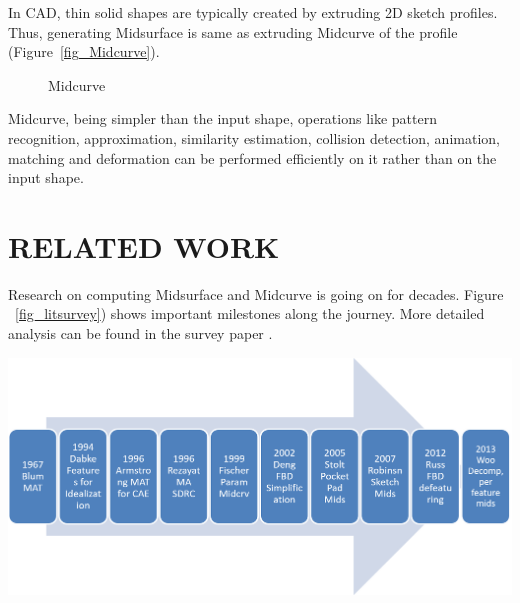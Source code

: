 \documentclass[9pt,academicons]{article}
\begin{document}
In CAD, thin solid shapes are typically created by extruding 2D sketch profiles. Thus, generating Midsurface is same as extruding Midcurve of the profile (Figure~\ref{fig_Midcurve}).

	\begin{figure} [!h]
		\centering
	 \quad
		\caption{Midcurve}
	\end{figure}
	
	
Midcurve, being simpler than the input shape, operations like pattern recognition, approximation, similarity estimation, collision detection, animation, matching and deformation can be performed efficiently on it rather than on the input shape. 



\section{RELATED WORK}

Research on computing Midsurface and Midcurve is going on for decades. Figure ~\ref{fig_litsurvey}) shows important milestones along the journey. More detailed analysis can be found in the survey paper \cite{medial2010}.

    \begin{center}
	\includegraphics[width=\linewidth]{images/Midcurve15}
	\label{fig_litsurvey}
    \end{center}
    
\end{document}

